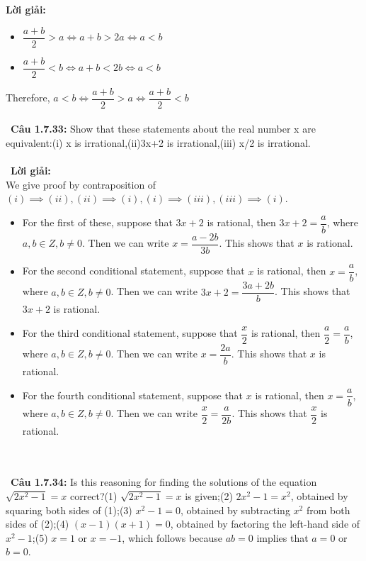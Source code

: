 \documentclass[a4paper]{article}
\begin{document}
\textbf{Lời giải: } \begin{itemize}
\item $\dfrac{a+b}{2} > a \Leftrightarrow a+b>2a \Leftrightarrow a<b$
\item $\dfrac{a+b}{2} < b \Leftrightarrow a+b<2b \Leftrightarrow a<b$ 
\end{itemize}
Therefore, $a<b \Leftrightarrow \dfrac{a+b}{2}>a \Leftrightarrow \dfrac{a+b}{2}<b$ \\\ \\\
\textbf{Câu 1.7.33: }  Show that these statements about the real number x are equivalent:(i) x is irrational,(ii)3x+2 is irrational,(iii) x/2 is irrational.
 \\\ \\\
\textbf{Lời giải: } \\We give proof by contraposition of $(i) \implies (ii),(ii) \implies (i),(i) \implies (iii),(iii) \implies (i)$.
\begin{itemize}
\item For the first of these, suppose that $3x+2$ is rational, then $3x+2=\dfrac{a}{b}$, where $a,b \in Z, b\neq 0$. Then we can write $x=\dfrac{a-2b}{3b}$. This shows that $x$ is rational.
\item For the second conditional statement, suppose that $x$ is rational, then $x=\dfrac{a}{b}$, where $a,b \in Z, b\neq 0$. Then we can write $3x+2=\dfrac{3a+2b}{b}$. This shows that $3x+2$ is rational.
\item  For the third conditional statement, suppose that $\dfrac{x}{2}$ is rational, then $\dfrac{a}{2}=\dfrac{a}{b}$, where $a,b \in Z, b\neq 0$. Then we can write $x=\dfrac{2a}{b}$. This shows that $x$ is rational.
\item For the fourth conditional statement, suppose that $x$ is rational, then $x=\dfrac{a}{b}$, where $a,b \in Z, b\neq 0$. Then we can write $\dfrac{x}{2}=\dfrac{a}{2b}$. This shows that $\dfrac{x}{2}$ is rational.
\end{itemize}
 \\\ \\\
\textbf{Câu 1.7.34: }  Is this reasoning for finding the solutions of the equation $\sqrt{2x^{2}-1}=x$ correct?(1) $\sqrt{2x^{2}-1}=x$ is given;(2) $2x^{2}-1=x^{2}$, obtained by squaring both sides of (1);(3) $x^{2}-1=0$, obtained by subtracting $x^{2}$ from both sides of (2);(4) $(x-1)(x+1)=0$, obtained by factoring the left-hand side of $x^{2}-1$;(5) $x=1$ or $x=-1$, which follows because $ab=0$ implies that $a=0$ or $b=0$. \\\ \\\
\end{document}
